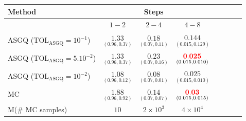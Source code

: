 

\begin{table}[h!]
	\centering
	\begin{tabular}{l*{6}{c}r}
		\toprule[1.5pt]
	Method & & Steps  & &     \\
	\hline
		          & $1-2$ & $2-4$ & $4-8$  \\
		\hline
		ASGQ ($\text{TOL}_{\text{ASGQ}}=10^{-1}$)  & $\underset{(0.96,0.37)}{\mathbf{  1.33}}$ & $\underset{(0.07,0.11)}{\mathbf{0.18}}$ & $\underset{(0.015,0.129)}{\mathbf{0.144}}$   \\
		ASGQ ($\text{TOL}_{\text{ASGQ}}=5.10^{-2}$)  & $\underset{(0.96,0.37)}{\mathbf{  1.33}}$ & $\underset{(0.07,0.16)}{\mathbf{ 0.23}}$ & $\underset{(0.015,0.010)}{\mathbf{  {\color{red}0.025}}}$   \\
		ASGQ ($\text{TOL}_{\text{ASGQ}}=10^{-2}$)  & $\underset{(0.96,0.12)}{\mathbf{   1.08
		}}$ & $\underset{(0.07,0.01)}{\mathbf{0.08}}$ & $\underset{(0.015,0.010)}{\mathbf{ 0.025}}$  \\
		

%		
		
				\hline
		
		MC &$\underset{(0.96,0.92)}{\mathbf{1.88}}$  & $\underset{(0.07,0.07)}{\mathbf{0.14}}$ & $\underset{(0.015,0.015)}{\mathbf{{\color{red}0.03}}}$  \\
		M(\# MC samples) & $10$  & $2 \times 10^3$ & $4 \times 10^4$  \\


\end{tabular}
\end{table}
